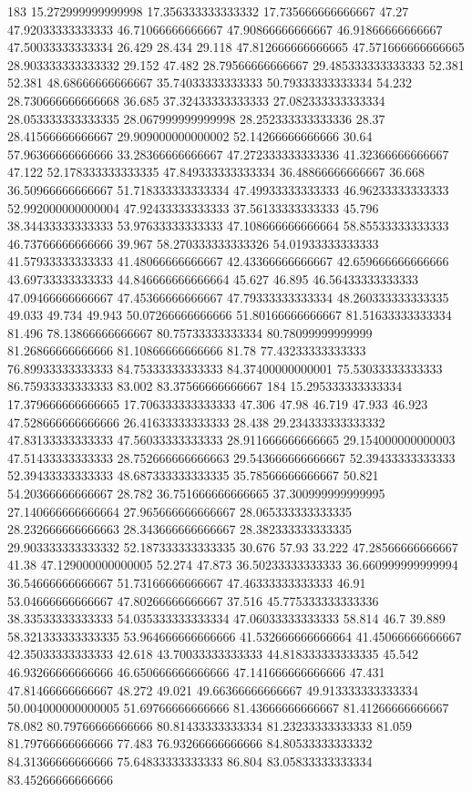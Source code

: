 183 15.272999999999998 17.356333333333332 17.735666666666667 47.27 47.92033333333333 46.71066666666667 47.90866666666667 46.91866666666667 47.50033333333334 26.429 28.434 29.118 47.812666666666665 47.571666666666665 28.903333333333332 29.152 47.482 28.79566666666667 29.485333333333333 52.381 52.381 48.68666666666667 35.74033333333333 50.79333333333334 54.232 28.730666666666668 36.685 37.32433333333333 27.082333333333334 28.053333333333335 28.067999999999998 28.252333333333336 28.37 28.41566666666667 29.909000000000002 52.14266666666666 30.64 57.96366666666666 33.28366666666667 47.272333333333336 41.32366666666667 47.122 52.178333333333335 47.849333333333334 36.48866666666667 36.668 36.50966666666667 51.718333333333334 47.49933333333333 46.96233333333333 52.992000000000004 47.92433333333333 37.56133333333333 45.796 38.34433333333333 53.97633333333333 47.108666666666664 58.85533333333333 46.73766666666666 39.967 58.270333333333326 54.01933333333333 41.57933333333333 41.48066666666667 42.43366666666667 42.659666666666666 43.69733333333333 44.846666666666664 45.627 46.895 46.56433333333333 47.09466666666667 47.45366666666667 47.79333333333334 48.260333333333335 49.033 49.734 49.943 50.07266666666666 51.80166666666667 81.51633333333334 81.496 78.13866666666667 80.75733333333334 80.78099999999999 81.26866666666666 81.10866666666666 81.78 77.43233333333333 76.89933333333333 84.75333333333333 84.37400000000001 75.53033333333333 86.75933333333333 83.002 83.37566666666667
184 15.295333333333334 17.379666666666665 17.706333333333333 47.306 47.98 46.719 47.933 46.923 47.528666666666666 26.41633333333333 28.438 29.234333333333332 47.83133333333333 47.56033333333333 28.911666666666665 29.154000000000003 47.51433333333333 28.752666666666663 29.543666666666667 52.39433333333333 52.39433333333333 48.687333333333335 35.78566666666667 50.821 54.20366666666667 28.782 36.751666666666665 37.300999999999995 27.140666666666664 27.965666666666667 28.065333333333335 28.232666666666663 28.343666666666667 28.382333333333335 29.903333333333332 52.187333333333335 30.676 57.93 33.222 47.28566666666667 41.38 47.129000000000005 52.274 47.873 36.50233333333333 36.660999999999994 36.54666666666667 51.73166666666667 47.46333333333333 46.91 53.04666666666667 47.80266666666667 37.516 45.775333333333336 38.33533333333333 54.035333333333334 47.06033333333333 58.814 46.7 39.889 58.321333333333335 53.964666666666666 41.532666666666664 41.45066666666667 42.35033333333333 42.618 43.70033333333333 44.818333333333335 45.542 46.93266666666666 46.650666666666666 47.141666666666666 47.431 47.81466666666667 48.272 49.021 49.66366666666667 49.913333333333334 50.004000000000005 51.69766666666666 81.43666666666667 81.41266666666667 78.082 80.79766666666666 80.81433333333334 81.23233333333333 81.059 81.79766666666666 77.483 76.93266666666666 84.80533333333332 84.31366666666666 75.64833333333333 86.804 83.05833333333334 83.45266666666666
